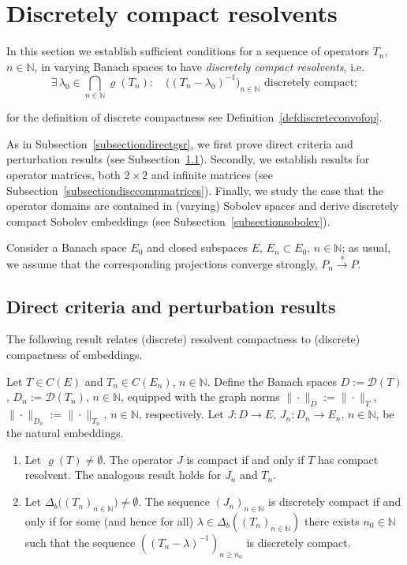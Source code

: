 \documentclass[a4paper,reqno]{amsart}
\begin{document}
\section{Discretely compact resolvents}\label{sectionsuffcondforcompres}
In this section we establish sufficient conditions for  a sequence of operators $T_n$, $n\in{\mathbb{N}}$, in varying Banach spaces to have \emph{discretely compact resolvents},
i.e.\ $$\exists\,\lambda_0\in\underset{n\in{\mathbb{N}}}{\bigcap}\varrho(T_n):\quad \big((T_n-\lambda_0)^{-1}\big)_{n\in{\mathbb{N}}}\text{ discretely compact};$$ 
\vspace{-4mm}

\noindent
for the definition of discrete compactness see Definition~\ref{defdiscreteconvofop}.

As in Subsection~\ref{subsectiondirectgsr}, we first prove direct criteria and perturbation results (see Subsection~\ref{subsectiondirectdiscretecomp}).
Secondly, we establish results for operator matrices, both $2\times 2$ and infinite matrices (see Subsection~\ref{subsectiondisccompmatrices}).
Finally, we study the case that the operator domains are contained in (varying) Sobolev spaces and derive discretely compact Sobolev embeddings (see Subsection~\ref{subsectionsobolev}).

Consider a Banach space $E_0$  and closed subspaces $E,\,E_n\subset E_0, \,n\in{\mathbb{N}}$; as usual, we assume that the corresponding  projections converge strongly, $P_n{\stackrel{s}{\rightarrow}} P$.

\subsection{Direct criteria and perturbation results}\label{subsectiondirectdiscretecomp}

The following result relates (discrete) resolvent compactness to (discrete) compactness of embeddings.

\begin{prop}
Let $T\in C(E)$ and $T_n\in C(E_n)$, $n\in{\mathbb{N}}$.
 Define the Banach spaces 
$D:={\mathcal D}(T)$, $D_n:={\mathcal D}(T_n)$, $n\in{\mathbb{N}}$, 
equipped with the
graph norms $\|\cdot\|_D:=\|\cdot\|_T$, $\|\cdot\|_{D_n}:=\|\cdot\|_{T_n}$, $n\in{\mathbb{N}}$, respectively.
 Let $J:D\to E, \,J_n:D_n\to E_n$, $n\in{\mathbb{N}}$, be the natural embeddings. 
\begin{enumerate}[label=\rm{\roman{*})}]
\item  Let $\varrho(T)\neq\emptyset$. The operator $J$ is compact if and only if $T$ has compact resolvent. The analogous result holds for $J_n$ and $T_n$.
\item Let $\Delta_b\big((T_n)_{n\in{\mathbb{N}}}\big)\neq\emptyset$.
The sequence $(J_n)_{n\in{\mathbb{N}}}$ is discretely compact if and only if for some {\rm(}and hence for all{\rm)} $\lambda\in\Delta_b\left((T_n)_{n\in{\mathbb{N}}}\right)$ there exists $n_0\in{\mathbb{N}}$ 
such that the sequence $\left((T_n-\lambda)^{-1}\right)_{n\geq n_0}$ is discretely compact.
\end{enumerate}
\label{equivcomp}
\end{prop}
\end{document}

